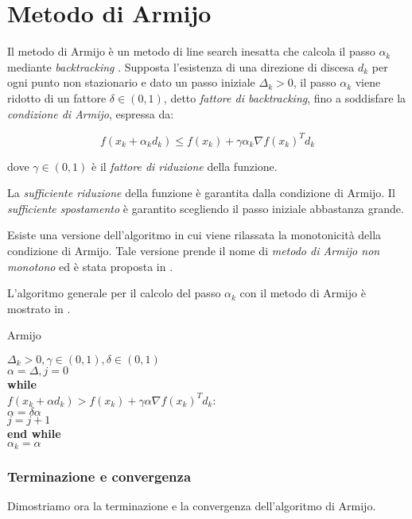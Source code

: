 \chapter{Metodo di Armijo}
\label{chp:methods.armijo}
Il metodo di Armijo è un metodo di line search inesatta che calcola il passo
$\alpha_{k}$ mediante \textit{backtracking} \cite{armijo1966minimization}.
Supposta l'esistenza di una direzione di discesa $d_{k}$ per ogni punto non
stazionario e dato un passo iniziale $\Delta_{k}>0$, il passo $\alpha_{k}$ viene
ridotto di un fattore $\delta\in(0,1)$, detto \textit{fattore di backtracking},
fino a soddisfare la \textit{condizione di Armijo}, espressa da:

\begin{equation}
\label{eqn:methods.armijo.condition}
f(x_{k}+\alpha_{k}d_{k})\leq f(x_{k})+\gamma\alpha_{k}\nabla f(x_{k})^{T}d_{k}
\end{equation}

dove $\gamma\in(0,1)$ è il \textit{fattore di riduzione} della funzione.

La \textit{sufficiente riduzione} della funzione è garantita dalla condizione di
Armijo. Il \textit{sufficiente spostamento} è garantito scegliendo il passo
iniziale abbastanza grande.

Esiste una versione dell'algoritmo in cui viene rilassata la monotonicità della
condizione di Armijo. Tale versione prende il nome di \textit{metodo di Armijo
non monotono} ed è stata proposta in \cite{grippo1986nonmonotone}.

L'algoritmo generale per il calcolo del passo $\alpha_{k}$ con il metodo di Armijo
è mostrato in .

\begin{algorithm}
	\label{alg:methods.armijo}
	\caption{Armijo}
	$\Delta_{k}>0, \gamma\in(0,1),\delta\in(0,1)$ \\
	$\alpha=\Delta,j=0$ \\
	\textbf{while} \\
	$f(x_{k}+\alpha d_{k}) > f(x_{k})+\gamma\alpha\nabla f(x_{k})^{T}d_{k}$: \\
	$\alpha=\delta\alpha$ \\
	$j=j+1$ \\
	\textbf{end while} \\
	$\alpha_{k}=\alpha$
\end{algorithm}


\subsection{Terminazione e convergenza}
\label{sec:methods.armijo.termination.convergence}
Dimostriamo ora la terminazione e la convergenza dell'algoritmo di Armijo.


